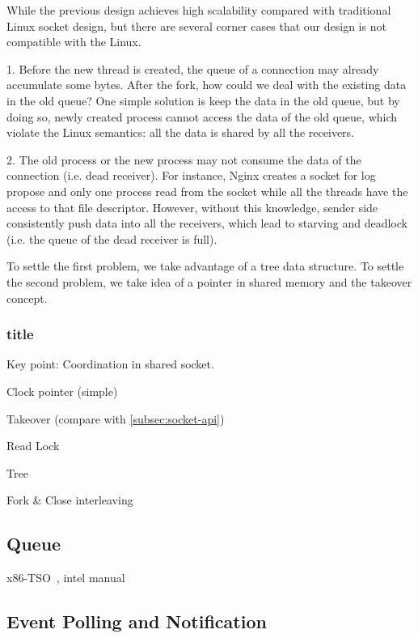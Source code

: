 While the previous design achieves high scalability compared with traditional Linux socket design, but there are several corner cases that our design is not compatible with the Linux.

1. Before the new thread is created, the queue of a connection may already accumulate some bytes. After the fork, how could we deal with the existing data in the old queue? One simple solution is keep the data in the old queue, but by doing so, newly created process cannot access the data of the old queue, which violate the Linux semantics: all the data is shared by all the receivers. 

2. The old process or the new process may not consume the data of the connection (i.e. dead receiver). For instance, Nginx creates a socket for log propose and only one process read from the socket while all the threads have the access to that file descriptor. However, without this knowledge, sender side consistently push data into all the receivers, which lead to starving and deadlock (i.e. the queue of the dead receiver is full).

To settle the first problem, we take advantage of a tree data structure. To settle the second problem, we take idea of a pointer in shared memory and the takeover concept.

\subsubsection{title}  



Key point: Coordination in shared socket.

Clock pointer (simple)

Takeover (compare with \ref{subsec:socket-api})

Read Lock

Tree

Fork \& Close interleaving

\subsection{Queue}

x86-TSO~\cite{sewell2010x86}, intel manual~\cite{intel-manual}

\subsection{Event Polling and Notification}
\label{subsec:epoll}

